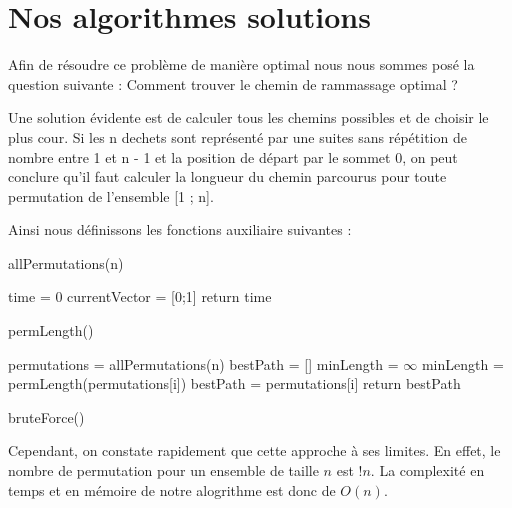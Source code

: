 \documentclass{report}
\begin{document}
\section{Nos algorithmes solutions}

Afin de résoudre ce problème de manière optimal nous nous sommes posé la question suivante : Comment trouver le chemin de rammassage optimal ?

Une solution évidente est de calculer tous les chemins possibles et de choisir le plus cour. Si les n dechets sont représenté par une suites sans répétition de nombre entre 1 et n - 1 et la position de départ par le sommet 0, on peut conclure qu'il faut calculer la longueur du chemin parcourus pour toute permutation de l'ensemble [1 ; n].

Ainsi nous définissons les fonctions auxiliaire suivantes : \\

\begin{algorithm}[H]
  \SetAlgoLined
  \caption{allPermutations(n)}
\end{algorithm}

\begin{algorithm}[H]
    \SetAlgoLined
    time = 0\;
    currentVector = [0;1]\;
    return time\;
    \caption{permLength()}
  \end{algorithm}

  \begin{algorithm}[H]
    \SetAlgoLined
    permutations = allPermutations(n)\;
    bestPath = []\;
    minLength = $\infty$ \;
    {
        {
            minLength = permLength(permutations[i])\;
            bestPath = permutations[i]\;
        }
    }
    return bestPath\;
    \caption{bruteForce()}
  \end{algorithm}

  Cependant, on constate rapidement que cette approche à ses limites. En effet, le nombre de permutation pour un ensemble de taille $n$ est $!n$. La complexité en temps et en mémoire de notre alogrithme est donc de $O(n)$.
\end{document}
